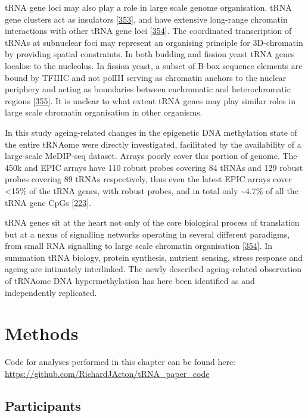 \documentclass[
]{book}
\begin{document}
tRNA gene loci may also play a role in large scale genome organisation.
tRNA gene clusters act as insulators {[}\protect\hyperlink{ref-Raab2011}{353}{]}, and have extensive long-range chromatin interactions with other tRNA gene loci {[}\protect\hyperlink{ref-VanBortle2017}{354}{]}.
The coordinated transcription of tRNAs at subnuclear foci may represent an organising principle for 3D-chromatin by providing spatial constraints.
In both budding and fission yeast tRNA genes localise to the nucleolus.
In fission yeast, a subset of B-box sequence elements are bound by TFIIIC and not polIII serving as chromatin anchors to the nuclear periphery and acting as boundaries between euchromatic and heterochromatic regions {[}\protect\hyperlink{ref-Noma2006}{355}{]}.
It is unclear to what extent tRNA genes may play similar roles in large scale chromatin organisation in other organisms.

In this study ageing-related changes in the epigenetic DNA methylation state of the entire tRNAome were directly investigated, facilitated by the availability of a large-scale MeDIP-seq dataset.
Arrays poorly cover this portion of genome.
The 450k and EPIC arrays have 110 robust probes covering 84 tRNAs and 129 robust probes covering 89 tRNAs respectively, thus even the latest EPIC arrays cover \textless15\% of the tRNA genes, with robust probes, and in total only \textasciitilde4.7\% of all the tRNA gene CpGs {[}\protect\hyperlink{ref-Zhou2017}{223}{]}.

tRNA genes sit at the heart not only of the core biological process of translation but at a nexus of signalling networks operating in several different paradigms, from small RNA signalling to large scale chromatin organisation {[}\protect\hyperlink{ref-VanBortle2017}{354}{]}.
In summation tRNA biology, protein synthesis, nutrient sensing, stress response and ageing are intimately interlinked.
The newly described ageing-related observation of tRNAome DNA hypermethylation has here been identified as and independently replicated.

\newpage

\hypertarget{tRNAmethods}{%
\section{Methods}\label{tRNAmethods}}

Code for analyses performed in this chapter can be found here: \url{https://github.com/RichardJActon/tRNA_paper_code}

\hypertarget{tRNA-Participants}{%
\subsection{Participants}\label{tRNA-Participants}}
\end{document}

